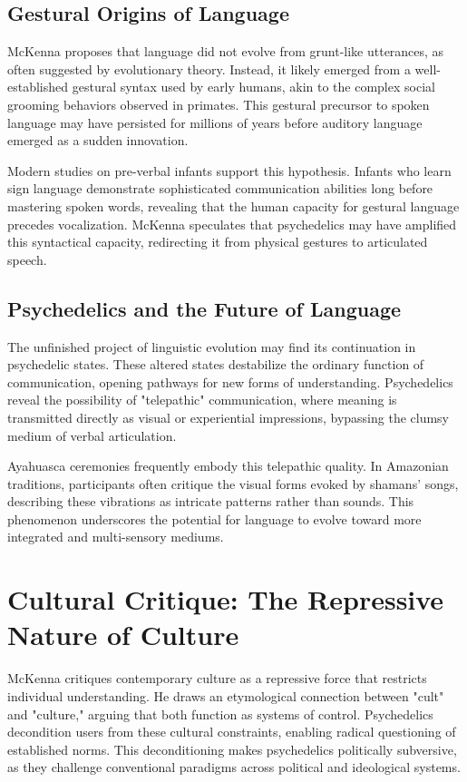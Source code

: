 \documentclass[12pt]{article}
\begin{document}
\subsection*{Gestural Origins of Language}

McKenna proposes that language did not evolve from grunt-like utterances, as often suggested by evolutionary theory. Instead, it likely emerged from a well-established gestural syntax used by early humans, akin to the complex social grooming behaviors observed in primates. This gestural precursor to spoken language may have persisted for millions of years before auditory language emerged as a sudden innovation.

Modern studies on pre-verbal infants support this hypothesis. Infants who learn sign language demonstrate sophisticated communication abilities long before mastering spoken words, revealing that the human capacity for gestural language precedes vocalization. McKenna speculates that psychedelics may have amplified this syntactical capacity, redirecting it from physical gestures to articulated speech.

\subsection*{Psychedelics and the Future of Language}

The unfinished project of linguistic evolution may find its continuation in psychedelic states. These altered states destabilize the ordinary function of communication, opening pathways for new forms of understanding. Psychedelics reveal the possibility of "telepathic" communication, where meaning is transmitted directly as visual or experiential impressions, bypassing the clumsy medium of verbal articulation.

Ayahuasca ceremonies frequently embody this telepathic quality. In Amazonian traditions, participants often critique the visual forms evoked by shamans' songs, describing these vibrations as intricate patterns rather than sounds. This phenomenon underscores the potential for language to evolve toward more integrated and multi-sensory mediums.

\section*{Cultural Critique: The Repressive Nature of Culture}

McKenna critiques contemporary culture as a repressive force that restricts individual understanding. He draws an etymological connection between "cult" and "culture," arguing that both function as systems of control. Psychedelics decondition users from these cultural constraints, enabling radical questioning of established norms. This deconditioning makes psychedelics politically subversive, as they challenge conventional paradigms across political and ideological systems.
\end{document}
